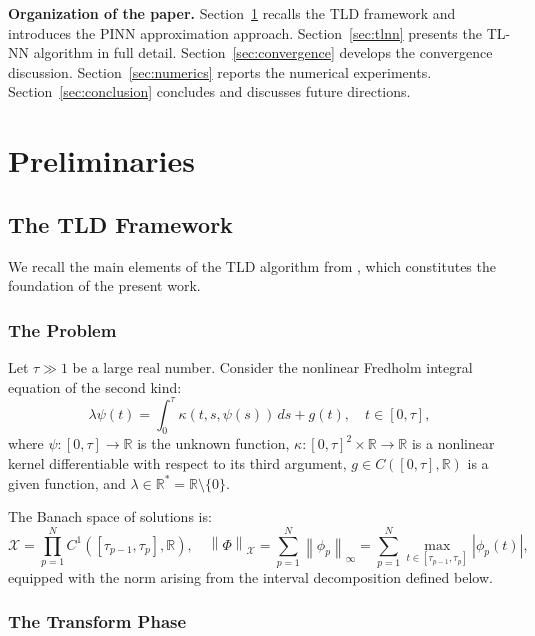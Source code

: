 \documentclass[12pt, a4paper]{article}
\newcommand{\norm}[1]{\left\| #1 \right\|}
\newcommand{\abs}[1]{\left| #1 \right|}
\newcommand{\R}{\mathbb{R}}
\begin{document}
\textbf{Organization of the paper.}
Section~\ref{sec:preliminaries} recalls the TLD framework
and introduces the PINN approximation approach.
Section~\ref{sec:tlnn} presents the TL-NN algorithm in full
detail.
Section~\ref{sec:convergence} develops the convergence
discussion.
Section~\ref{sec:numerics} reports the numerical experiments.
Section~\ref{sec:conclusion} concludes and discusses future
directions.

\section{Preliminaries}
\label{sec:preliminaries}

\subsection{The TLD Framework}
\label{subsec:tld}

We recall the main elements of the TLD algorithm from
\cite{sedka2025}, which constitutes the foundation of the
present work.

\subsubsection{The Problem}

Let $\tau \gg 1$ be a large real number.
Consider the nonlinear Fredholm integral equation of the
second kind:
\begin{equation}
  \lambda \psi(t) = \int_0^\tau \kappa(t, s, \psi(s)) \, ds
  + g(t), \quad t \in [0, \tau],
  \label{eq:main}
\end{equation}
where $\psi : [0, \tau] \to \R$ is the unknown function,
$\kappa : [0, \tau]^2 \times \R \to \R$ is a nonlinear kernel
differentiable with respect to its third argument,
$g \in C([0, \tau], \R)$ is a given function, and
$\lambda \in \R^* = \R \setminus \{0\}$.

The Banach space of solutions is:
\begin{equation*}
  \mathcal{X} = \prod_{p=1}^{N} C^1([\tau_{p-1}, \tau_p], \R),
  \quad
  \norm{\Phi}_\mathcal{X} = \sum_{p=1}^{N}
  \norm{\phi_p}_\infty
  = \sum_{p=1}^{N} \max_{t \in [\tau_{p-1}, \tau_p]}
  \abs{\phi_p(t)},
\end{equation*}
equipped with the norm arising from the interval
decomposition defined below.

\subsubsection{The Transform Phase}
\end{document}
